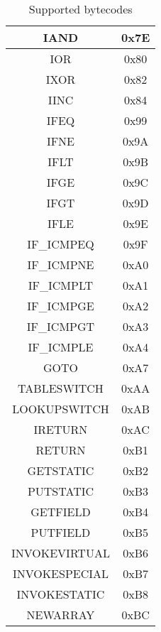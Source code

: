 \begin{table}[!htb]
\begin{tabular}{|c|c|}
\hline 
IAND & 0x7E \\
\hline 
IOR &  0x80 \\
\hline 
IXOR & 0x82 \\
\hline 
IINC & 0x84 \\
\hline 
IFEQ & 0x99 \\
\hline 
IFNE & 0x9A \\
\hline 
IFLT & 0x9B \\
\hline 
IFGE & 0x9C \\
\hline 
IFGT & 0x9D \\
\hline 
IFLE & 0x9E \\
\hline 
IF\_ICMPEQ & 0x9F \\
\hline 
IF\_ICMPNE & 0xA0 \\
\hline 
IF\_ICMPLT & 0xA1 \\
\hline 
IF\_ICMPGE & 0xA2 \\
\hline 
IF\_ICMPGT & 0xA3 \\
\hline 
IF\_ICMPLE & 0xA4 \\
\hline 
GOTO & 0xA7 \\
\hline 
TABLESWITCH & 0xAA \\
\hline 
LOOKUPSWITCH & 0xAB \\
\hline 
IRETURN & 0xAC \\
\hline 
RETURN & 0xB1 \\
\hline 
GETSTATIC & 0xB2 \\
\hline 
PUTSTATIC & 0xB3 \\
\hline 
GETFIELD & 0xB4 \\
\hline 
PUTFIELD & 0xB5 \\
\hline 
INVOKEVIRTUAL & 0xB6 \\
\hline 
INVOKESPECIAL & 0xB7 \\
\hline 
INVOKESTATIC & 0xB8 \\
\hline 
NEWARRAY & 0xBC \\
\hline
\end{tabular}
\caption{Supported bytecodes}
\label{tab:Appx:Bytecodes}
\end{table}

